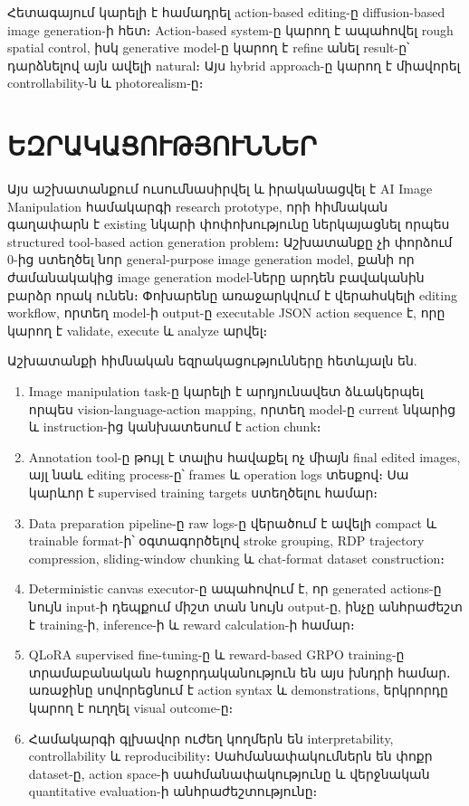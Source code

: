 \documentclass[12pt,a4paper]{report}
\newcommand{\Eng}[1]{\textenglish{#1}}
\begin{document}
Հետագայում կարելի է համադրել action-based editing-ը diffusion-based image generation-ի հետ։ Action-based system-ը կարող է ապահովել rough spatial control, իսկ generative model-ը կարող է refine անել result-ը՝ դարձնելով այն ավելի natural։ Այս hybrid approach-ը կարող է միավորել controllability-ն և photorealism-ը։

\chapter*{ԵԶՐԱԿԱՑՈՒԹՅՈՒՆՆԵՐ}

Այս աշխատանքում ուսումնասիրվել և իրականացվել է \Eng{AI Image Manipulation} համակարգի research prototype, որի հիմնական գաղափարն է existing նկարի փոփոխությունը ներկայացնել որպես structured tool-based action generation problem։ Աշխատանքը չի փորձում 0-ից ստեղծել նոր general-purpose image generation model, քանի որ ժամանակակից image generation model-ները արդեն բավականին բարձր որակ ունեն։ Փոխարենը առաջարկվում է վերահսկելի editing workflow, որտեղ model-ի output-ը executable JSON action sequence է, որը կարող է validate, execute և analyze արվել։

Աշխատանքի հիմնական եզրակացությունները հետևյալն են.
\begin{enumerate}
    \item Image manipulation task-ը կարելի է արդյունավետ ձևակերպել որպես \Eng{vision-language-action} mapping, որտեղ model-ը current նկարից և instruction-ից կանխատեսում է action chunk։
    \item Annotation tool-ը թույլ է տալիս հավաքել ոչ միայն final edited images, այլ նաև editing process-ը՝ frames և operation logs տեսքով։ Սա կարևոր է supervised training targets ստեղծելու համար։
    \item Data preparation pipeline-ը raw logs-ը վերածում է ավելի compact և trainable format-ի՝ օգտագործելով stroke grouping, RDP trajectory compression, sliding-window chunking և chat-format dataset construction։
    \item Deterministic canvas executor-ը ապահովում է, որ generated actions-ը նույն input-ի դեպքում միշտ տան նույն output-ը, ինչը անհրաժեշտ է training-ի, inference-ի և reward calculation-ի համար։
    \item QLoRA supervised fine-tuning-ը և reward-based GRPO training-ը տրամաբանական հաջորդականություն են այս խնդրի համար․ առաջինը սովորեցնում է action syntax և demonstrations, երկրորդը կարող է ուղղել visual outcome-ը։
    \item Համակարգի գլխավոր ուժեղ կողմերն են interpretability, controllability և reproducibility։ Սահմանափակումներն են փոքր dataset-ը, action space-ի սահմանափակությունը և վերջնական quantitative evaluation-ի անհրաժեշտությունը։
\end{enumerate}
\end{document}
